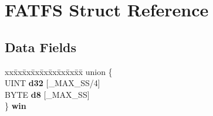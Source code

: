 \hypertarget{struct_f_a_t_f_s}{}\section{F\+A\+T\+FS Struct Reference}
\label{struct_f_a_t_f_s}
\subsection*{Data Fields}
\begin{DoxyCompactItemize}
\item 
\mbox{\label{struct_f_a_t_f_s_afa62f004a7f3496c36564fbe55e26332}} 
\begin{tabbing}
xx\=xx\=xx\=xx\=xx\=xx\=xx\=xx\=xx\=\kill
union \{\\
\>UINT {\bfseries d32} \mbox{[}\_MAX\_SS/4\mbox{]}\\
\>BYTE {\bfseries d8} \mbox{[}\_MAX\_SS\mbox{]}\\
\} {\bfseries win}\\


\end{tabbing}
\end{DoxyCompactItemize}
